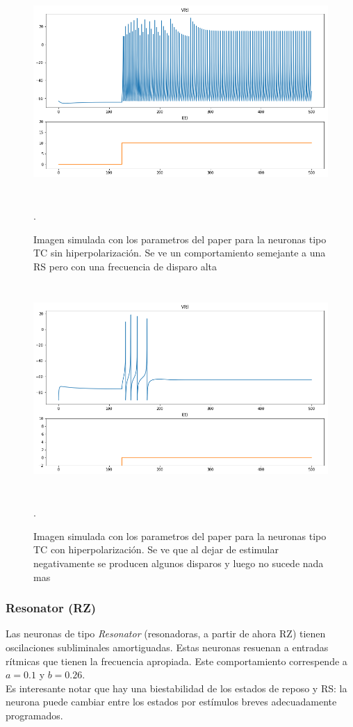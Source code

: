\documentclass[12pt]{article}
\begin{document}
\begin{figure}[h!]
    \centering
        \includegraphics[height=8cm]{images/TC_normal.png}
    \caption[fontsize=2pt]{Imagen simulada con los parametros del paper para la neuronas tipo TC sin hiperpolarización. Se ve un comportamiento semejante a una RS pero con una frecuencia de disparo alta}.
\end{figure}
\newpage

\begin{figure}[h!]
    \centering
        \includegraphics[height=8cm]{images/TC_hiper.png}
    \caption[fontsize=2pt]{Imagen simulada con los parametros del paper para la neuronas tipo TC con hiperpolarización. Se ve que al dejar de estimular negativamente se producen algunos disparos y luego no sucede nada mas}.
\end{figure}
\newpage

\subsubsection{Resonator (RZ)}
Las neuronas de tipo \textit{Resonator} (resonadoras, a partir de ahora RZ) tienen oscilaciones subliminales amortiguadas. Estas neuronas resuenan a entradas rítmicas que tienen la frecuencia apropiada.
Este comportamiento correspende a $a = 0.1$ y $b = 0.26$. \\
Es interesante notar que hay una biestabilidad de los estados de reposo y RS: la neurona puede cambiar entre los estados por estímulos breves adecuadamente programados.
\end{document}
